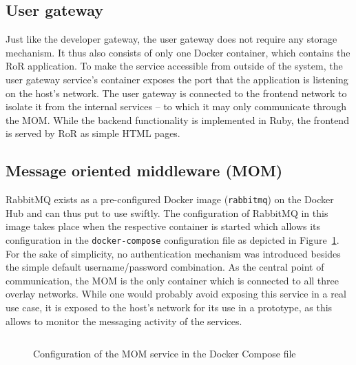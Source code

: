 
  \subsection{User gateway} %
    \label{sub:user_gateway}
    Just like the developer gateway, the user gateway does not require any storage mechanism. It thus also consists of only one Docker container, which contains the \ac{RoR} application. To make the service accessible from outside of the system, the user gateway service's container exposes the port that the  application is listening on the host's network. The user gateway is connected to the frontend network to isolate it from the internal services -- to which it may only communicate through the \ac{MOM}.
    While the backend functionality is implemented in Ruby, the frontend is served by \ac{RoR} as simple \ac{HTML} pages.

  \subsection{Message oriented middleware (MOM)} %
    \label{sub:message_oriented_middleware}
      RabbitMQ exists as a pre-configured Docker image (\texttt{rabbitmq}) on the Docker Hub and can thus put to use swiftly. The configuration of RabbitMQ in this image takes place when the respective container is started which allows its configuration in the \texttt{docker-compose} configuration file as depicted in Figure~\ref{fig:configuration_of_the_mom_service_in_the_docker_compose_file}.
      For the sake of simplicity, no authentication mechanism was introduced besides the simple default username/password combination. As the central point of communication, the \ac{MOM} is the only container which is connected to all three overlay networks. While one would probably avoid exposing this service in a real use case, it is exposed to the host's network for its use in a prototype, as this allows to monitor the messaging activity of the services.

      \begin{figure}[!htbp]
        \inputminted[firstline=23,lastline=33,fontsize=\footnotesize,linenos=true,numberblanklines=true,showspaces=false,breaklines=true,baselinestretch=1]{yaml}{../code/wfms.yml}
        \caption{Configuration of the \ac{MOM} service in the Docker Compose file}
        \label{fig:configuration_of_the_mom_service_in_the_docker_compose_file}
      \end{figure}

